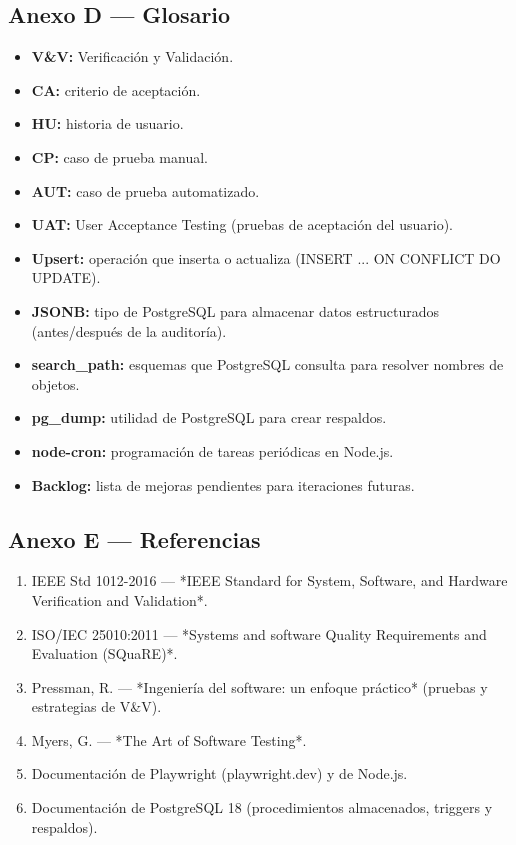 \documentclass[11pt,a4paper]{article}
\begin{document}
\subsection*{Anexo D --- Glosario}


\begin{itemize}[leftmargin=*]
\item \textbf{V\&V:} Verificación y Validación.
\item \textbf{CA:} criterio de aceptación.
\item \textbf{HU:} historia de usuario.
\item \textbf{CP:} caso de prueba manual.
\item \textbf{AUT:} caso de prueba automatizado.
\item \textbf{UAT:} User Acceptance Testing (pruebas de aceptación del usuario).
\item \textbf{Upsert:} operación que inserta o actualiza (INSERT ... ON CONFLICT DO UPDATE).
\item \textbf{JSONB:} tipo de PostgreSQL para almacenar datos estructurados (antes/después de la auditoría).
\item \textbf{search\_path:} esquemas que PostgreSQL consulta para resolver nombres de objetos.
\item \textbf{pg\_dump:} utilidad de PostgreSQL para crear respaldos.
\item \textbf{node-cron:} programación de tareas periódicas en Node.js.
\item \textbf{Backlog:} lista de mejoras pendientes para iteraciones futuras.
\end{itemize}


\subsection*{Anexo E --- Referencias}


\begin{enumerate}[leftmargin=*]
\item IEEE Std 1012-2016 --- *IEEE Standard for System, Software, and Hardware Verification and Validation*.
\item ISO/IEC 25010:2011 --- *Systems and software Quality Requirements and Evaluation (SQuaRE)*.
\item Pressman, R. --- *Ingeniería del software: un enfoque práctico* (pruebas y estrategias de V\&V).
\item Myers, G. --- *The Art of Software Testing*.
\item Documentación de Playwright (playwright.dev) y de Node.js.
\item Documentación de PostgreSQL 18 (procedimientos almacenados, triggers y respaldos).
\end{enumerate}
\end{document}
